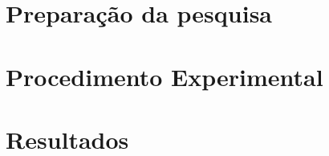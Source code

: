 \documentclass[
	11pt,
	openright,		%
	twoside,			%
	a4paper,			%
	english,			%
	brazil,			%
	]{book}
\begin{document}
 
\part{Preparação da pesquisa}

\part{Procedimento Experimental}

 
\part{Resultados}



\end{document}

